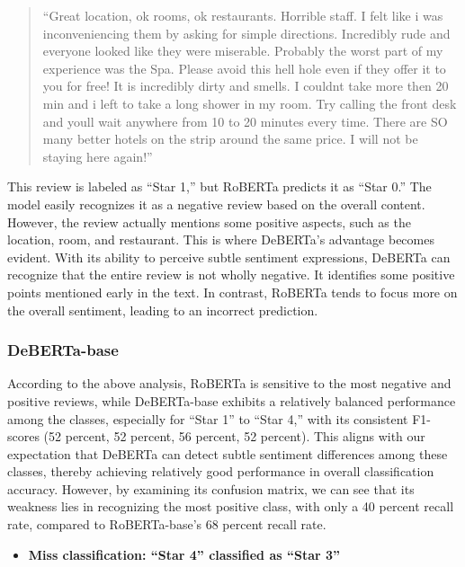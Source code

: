 \documentclass[12pt]{article}
\begin{document}
\begin{quote}“Great location, ok rooms, ok restaurants. Horrible staff. I felt like i was inconveniencing them by asking for simple directions. Incredibly rude and everyone looked like they were miserable. Probably the worst part of my experience was the Spa. Please avoid this hell hole even if they offer it to you for free! It is incredibly dirty and smells. I couldnt take more then 20 min and i left to take a long shower in my room. Try calling the front desk and youll wait anywhere from 10 to 20 minutes every time. There are SO many better hotels on the strip around the same price. I will not be staying here again!”
\end{quote}

This review is labeled as “Star 1,” but RoBERTa predicts it as “Star 0.” The model easily recognizes it as a negative review based on the overall content. However, the review actually mentions some positive aspects, such as the location, room, and restaurant. This is where DeBERTa's advantage becomes evident. With its ability to perceive subtle sentiment expressions, DeBERTa can recognize that the entire review is not wholly negative. It identifies some positive points mentioned early in the text. In contrast, RoBERTa tends to focus more on the overall sentiment, leading to an incorrect prediction.

\subsubsection{DeBERTa-base}
According to the above analysis, RoBERTa is sensitive to the most negative and positive reviews, while DeBERTa-base exhibits a relatively balanced performance among the classes, especially for “Star 1” to “Star 4,” with its consistent F1-scores (52 percent, 52 percent, 56 percent, 52 percent). This aligns with our expectation that DeBERTa can detect subtle sentiment differences among these classes, thereby achieving relatively good performance in overall classification accuracy. However, by examining its confusion matrix, we can see that its weakness lies in recognizing the most positive class, with only a 40 percent recall rate, compared to RoBERTa-base's 68 percent recall rate.

\begin{itemize}
  \item \textbf{Miss classification: “Star 4” classified as “Star 3”}
\end{itemize}
\end{document}
